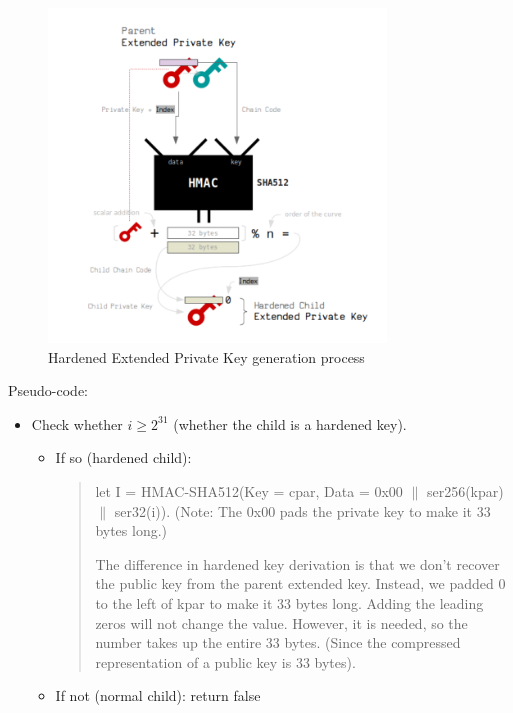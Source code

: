 \begin{adjustwidth}{0.5cm}{}
\begin{figure}[ht!]
    \centering
    \includegraphics[width=0.8\textwidth]{images/hard_private_gen.png}
    \caption[Hardened Extended Private Key generation process]{Hardened Extended Private Key generation process}
    \label{fig:3}
\end{figure}

Pseudo-code:

\begin{itemize}
    \item Check whether $i \geq 2^{31}$ (whether the child is a hardened key).
          \begin{itemize}
              \item If so (hardened child):  
              \begin{quote}

              let I = HMAC-SHA512(Key = cpar, Data = 0x00 $\parallel$ ser256(kpar) $\parallel$ ser32(i)). (Note: The 0x00 pads the private key to make it 33 bytes long.)

              The difference in hardened key derivation is that we don't recover the public key from the parent extended key. Instead, we padded 0 to the left of kpar to make it 33 bytes long. Adding the leading zeros will not change the value. However, it is needed, so the number takes up the entire 33 bytes. (Since the compressed representation of a public key is 33 bytes).
            \end{quote}


              \item If not (normal child): return false
                  

\end{itemize}
\end{itemize}
\end{adjustwidth}
